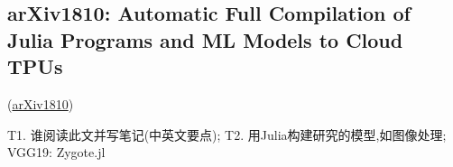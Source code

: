 \subsection{arXiv1810: Automatic Full Compilation of Julia Programs and ML Models to Cloud TPUs}
\label{paper:arxiv1810JuliaMLtoTPU}

\cite{fischer2018juliaMLtoTPU}(\href{https://arxiv.org/abs/1810.09868}{arXiv1810})

\redt{[TODO:\ZY 20181214]} 
T1. 谁阅读此文并写笔记(中英文要点);
T2. 用Julia构建研究的模型,如图像处理;
VGG19: Zygote.jl